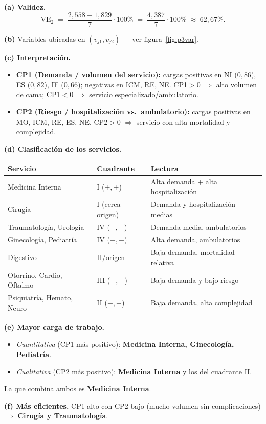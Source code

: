 \documentclass[11pt,a4paper]{article}
\begin{document}
\begin{solbox}
\textbf{(a) Validez.}
\[
\mathrm{VE}_2 \;=\; \frac{2{,}558+1{,}829}{7}\cdot 100\% \;=\; \frac{4{,}387}{7}\cdot 100\% \;\approx\; \boxed{62{,}67\%}.
\]

\textbf{(b)} Variables ubicadas en $(v_{j1},v_{j2})$ — ver figura~\ref{fig:p3var}.

\textbf{(c) Interpretación.}
\begin{itemize}[noitemsep,leftmargin=*]
\item \textbf{CP1 (Demanda / volumen del servicio):} cargas positivas en NI ($0{,}86$), ES ($0{,}82$), IF ($0{,}66$); negativas en ICM, RE, NE. CP1$>0$ $\Rightarrow$ alto volumen de cama; CP1$<0$ $\Rightarrow$ servicio especializado/ambulatorio.
\item \textbf{CP2 (Riesgo / hospitalización vs.\ ambulatorio):} cargas positivas en MO, ICM, RE, ES, NE. CP2$>0$ $\Rightarrow$ servicio con alta mortalidad y complejidad.
\end{itemize}

\textbf{(d) Clasificación de los servicios.}
\begin{center}\small
\begin{tabular}{lll}\toprule
Servicio & Cuadrante & Lectura\\\midrule
Medicina Interna & I ($+,+$) & Alta demanda + alta hospitalización\\
Cirugía          & I (cerca origen) & Demanda y hospitalización medias\\
Traumatología, Urología & IV ($+,-$) & Demanda media, ambulatorios\\
Ginecología, Pediatría & IV ($+,-$) & Alta demanda, ambulatorios\\
Digestivo & II/origen & Baja demanda, mortalidad relativa\\
Otorrino, Cardio, Oftalmo & III ($-,-$) & Baja demanda y bajo riesgo\\
Psiquiatría, Hemato, Neuro & II ($-,+$) & Baja demanda, alta complejidad\\
\bottomrule
\end{tabular}\end{center}

\textbf{(e) Mayor carga de trabajo.}
\begin{itemize}[noitemsep,leftmargin=*]
\item \emph{Cuantitativa} (CP1 más positivo): \textbf{Medicina Interna, Ginecología, Pediatría}.
\item \emph{Cualitativa} (CP2 más positivo): \textbf{Medicina Interna} y los del cuadrante II.
\end{itemize}
La que combina ambos es \textbf{Medicina Interna}.

\textbf{(f) Más eficientes.} CP1 alto con CP2 bajo (mucho volumen sin complicaciones) $\Rightarrow$ \textbf{Cirugía y Traumatología}.
\end{solbox}
\end{document}
